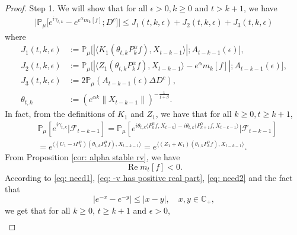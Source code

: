 \documentclass[12pt,a4paper]{amsart}
\theoremstyle{plain}
\theoremstyle{definition}
\numberwithin{equation}{section}
\begin{document}
\begin{proof}
    Step 1. We will show that for all $\epsilon > 0, k\geq 0$ and $t>k+1$, we have
\begin{equation}\begin{split}
    \big|\mathbb{P}_{\mu}\big[e^{i\gamma_{t,k}}-e^{e^{\alpha}m_k[f]}; D^c\big]\big|
    \leq J_1(t,k,\epsilon)+J_2(t,k,\epsilon)+J_3(t,k,\epsilon)
\end{split}\end{equation}
    where
\begin{equation}\begin{split}
\label{eq: Def of Ji}
    J_1(t,k,\epsilon)
    &:= \mathbb{P}_{\mu}\big[|\langle K_1(\theta_{t,k}P^\alpha_k f), X_{t-k-1}\rangle|; A_{t-k-1}(\epsilon) \big],
    \\ J_2(t,k,\epsilon)
    &:= \mathbb{P}_{\mu}\big[|\langle Z_1(\theta_{t,k}P^\alpha_k f),X_{t-k-1}\rangle-e^{\alpha}m_k[f]|; A_{t-k-1}(\epsilon)\big],
    \\ J_3(t,k, \epsilon)
    &:=2\mathbb{P}_{\mu}(A_{t-k-1}(\epsilon)\Delta D^c),
    \\\theta_{t,k}
    &:= (e^{\alpha k}\|X_{t-k-1}\|)^{-\frac{1}{1+\beta}}.
\end{split}\end{equation}
In fact, from the definitions of $K_1$ and $Z_1$, we have that for all
$k\geq 0, t\geq k+1$,
\begin{equation}\begin{split}
\label{eq: need1}
    &\mathbb{P}_{\mu}[e^{i\gamma_{t,k}}|\mathscr{F}_{t-k-1}]
    =\mathbb{P}_{\mu}[e^{i\theta_{t,k}\langle P^\alpha_k f,X_{t-k}\rangle-i\theta_{t,k}\langle P^\alpha_{k+1} f, X_{t-k-1}\rangle}|\mathscr{F}_{t-k-1}]
    \\&=e^{\langle (U_1 - iP^\alpha_1 ) (\theta_{t,k}P^\alpha_k f),X_{t-k-1}\rangle}
    =e^{\langle (Z_1 + K_1) (\theta_{t,k}P^\alpha_k f),X_{t-k-1}\rangle}.
\end{split}\end{equation}
    From Proposition \ref{cor: alpha stable rv}, we have
\begin{equation}
\label{eq: need2}
    \operatorname {Re} m_t[f] < 0.
\end{equation}
    According to \eqref{eq: need1}, \eqref{eq: -v has positive real part}, \eqref{eq: need2} and the fact that
\[
    |e^{-x} - e^{-y}| \leq |x-y|,\quad x,y \in \mathbb C_+,
\]
    we get that for all $k\geq 0$, $t\geq k+1$ and $\epsilon> 0$,
\begin{equation}\begin{split}

\end{split}
\end{equation}
\end{proof}
\end{document}

